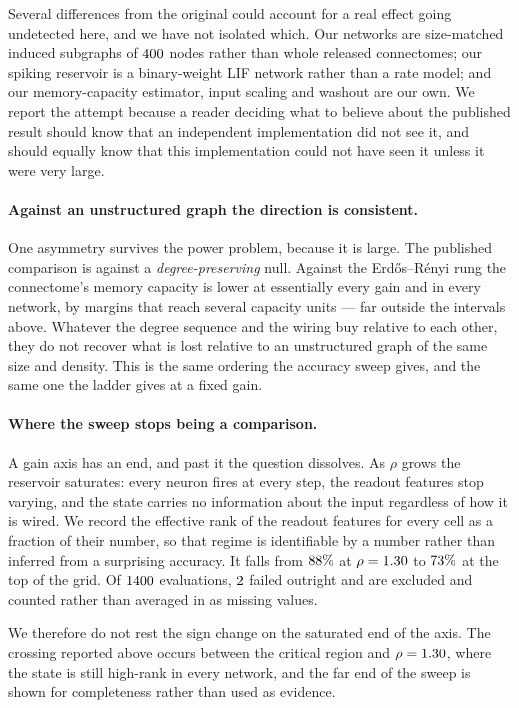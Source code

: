 Several differences from the original could account for a real effect going undetected
here, and we have not isolated which. Our networks are size-matched induced subgraphs of
$400$ nodes rather than whole released connectomes; our spiking reservoir is a
binary-weight LIF network rather than a rate model; and our memory-capacity estimator,
input scaling and washout are our own. We report the attempt because a reader deciding
what to believe about the published result should know that an independent implementation
did not see it, and should equally know that this implementation could not have seen it
unless it were very large.

\paragraph{Against an unstructured graph the direction is consistent.}
One asymmetry survives the power problem, because it is large. The published comparison
is against a \emph{degree-preserving} null. Against the Erd\H{o}s--R\'enyi rung the
connectome's memory capacity is lower at essentially every gain and in every network, by
margins that reach several capacity units --- far outside the intervals above. Whatever
the degree sequence and the wiring buy relative to each other, they do not recover what
is lost relative to an unstructured graph of the same size and density. This is the same
ordering the accuracy sweep gives, and the same one the ladder gives at a fixed gain.

\paragraph{Where the sweep stops being a comparison.}
A gain axis has an end, and past it the question dissolves. As $\rho$ grows the reservoir
saturates: every neuron fires at every step, the readout features stop varying, and the
state carries no information about the input regardless of how it is wired. We record the
effective rank of the readout features for every cell as a fraction of their number, so
that regime is identifiable by a number rather than inferred from a surprising accuracy.
It falls from $88\%$ at $\rho = 1.30$ to $73\%$ at the
top of the grid. Of $1400$ evaluations, $2$ failed outright and are
excluded and counted rather than averaged in as missing values.

We therefore do not rest the sign change on the saturated end of the axis. The crossing
reported above occurs between the critical region and $\rho = 1.30$, where the state
is still high-rank in every network, and the far end of the sweep is shown for
completeness rather than used as evidence.

